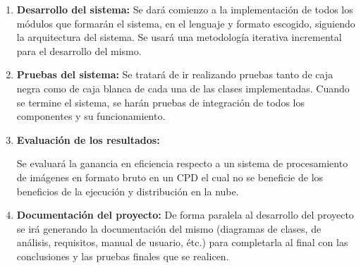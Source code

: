 \begin{enumerate}
\item\textbf{Desarrollo del sistema:}
Se dará comienzo a la implementación de todos los módulos que formarán el sistema, en el lenguaje y formato escogido, siguiendo la arquitectura del sistema.
Se usará una metodología iterativa incremental para el desarrollo del mismo.

\item \textbf{Pruebas del sistema:}
Se tratará de ir realizando pruebas tanto de caja negra como de caja blanca de cada una de las clases implementadas.
Cuando se termine el sistema, se harán pruebas de integración de todos los componentes y su funcionamiento.

\item\textbf{Evaluación de los resultados:}

Se evaluará la ganancia en eficiencia respecto a un sistema de procesamiento de imágenes en formato bruto en un CPD el cual no se beneficie de los beneficios de la ejecución y distribución en la nube.


\item\textbf{Documentación del proyecto:}
De forma paralela al desarrollo del proyecto se irá generando la documentación del mismo (diagramas de clases, de análisis, requisitos, manual de usuario, étc.) para completarla al final con las conclusiones y las
pruebas finales que se realicen.


\end{enumerate}







